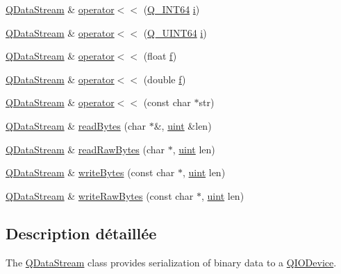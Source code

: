\begin{DoxyCompactItemize}
\item 
\hyperlink{class_q_data_stream}{Q\+Data\+Stream} \& \hyperlink{class_q_data_stream_afe1363161b0226397b87d6e878895339}{operator$<$$<$} (\hyperlink{qglobal_8h_a83547f6159951b80dd9951942533e685}{Q\+\_\+\+I\+N\+T64} \hyperlink{060__command__switch_8tcl_a8c90afd4641b25be86bd09983c3cbee0}{i})
\item 
\hyperlink{class_q_data_stream}{Q\+Data\+Stream} \& \hyperlink{class_q_data_stream_a096e99ad349228cd45a2bbb4256663e5}{operator$<$$<$} (\hyperlink{qglobal_8h_a63d4b44b9f20259c7cff6c1904c046ea}{Q\+\_\+\+U\+I\+N\+T64} \hyperlink{060__command__switch_8tcl_a8c90afd4641b25be86bd09983c3cbee0}{i})
\item 
\hyperlink{class_q_data_stream}{Q\+Data\+Stream} \& \hyperlink{class_q_data_stream_ac4e26950daf4c0f894d6b3e709b7ec58}{operator$<$$<$} (float \hyperlink{060__command__switch_8tcl_af6830d2c644b45088ea8f1f74a46b778}{f})
\item 
\hyperlink{class_q_data_stream}{Q\+Data\+Stream} \& \hyperlink{class_q_data_stream_a61587be69fdaa840c4d42eb592c79af2}{operator$<$$<$} (double \hyperlink{060__command__switch_8tcl_af6830d2c644b45088ea8f1f74a46b778}{f})
\item 
\hyperlink{class_q_data_stream}{Q\+Data\+Stream} \& \hyperlink{class_q_data_stream_acf97e65484056bc6b3fb150c4f339344}{operator$<$$<$} (const char $\ast$str)
\item 
\hyperlink{class_q_data_stream}{Q\+Data\+Stream} \& \hyperlink{class_q_data_stream_a296311b844103880ec50b43a2ebbfcaa}{read\+Bytes} (char $\ast$\&, \hyperlink{qglobal_8h_a4d3943ddea65db7163a58e6c7e8df95a}{uint} \&len)
\item 
\hyperlink{class_q_data_stream}{Q\+Data\+Stream} \& \hyperlink{class_q_data_stream_a04938bc54d1158276cf01be169d159ea}{read\+Raw\+Bytes} (char $\ast$, \hyperlink{qglobal_8h_a4d3943ddea65db7163a58e6c7e8df95a}{uint} len)
\item 
\hyperlink{class_q_data_stream}{Q\+Data\+Stream} \& \hyperlink{class_q_data_stream_a8f1af77d483ecfd515c9eac3822aaaa5}{write\+Bytes} (const char $\ast$, \hyperlink{qglobal_8h_a4d3943ddea65db7163a58e6c7e8df95a}{uint} len)
\item 
\hyperlink{class_q_data_stream}{Q\+Data\+Stream} \& \hyperlink{class_q_data_stream_aab2b83b4d7407ed57ff9eea136cb2e5e}{write\+Raw\+Bytes} (const char $\ast$, \hyperlink{qglobal_8h_a4d3943ddea65db7163a58e6c7e8df95a}{uint} len)
\end{DoxyCompactItemize}


\subsection{Description détaillée}
The \hyperlink{class_q_data_stream}{Q\+Data\+Stream} class provides serialization of binary data to a \hyperlink{class_q_i_o_device}{Q\+I\+O\+Device}. 

